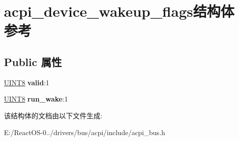 \hypertarget{structacpi__device__wakeup__flags}{}\section{acpi\+\_\+device\+\_\+wakeup\+\_\+flags结构体 参考}
\label{structacpi__device__wakeup__flags}
\subsection*{Public 属性}
\begin{DoxyCompactItemize}
\item 
\mbox{\label{structacpi__device__wakeup__flags_a314608629cdca87c358fc87f6c1158af}} 
\hyperlink{_processor_bind_8h_ab27e9918b538ce9d8ca692479b375b6a}{U\+I\+N\+T8} {\bfseries valid}\+:1
\item 
\mbox{\label{structacpi__device__wakeup__flags_ac9c0e88bbbe1d8ca8962ff822b3b0f3c}} 
\hyperlink{_processor_bind_8h_ab27e9918b538ce9d8ca692479b375b6a}{U\+I\+N\+T8} {\bfseries run\+\_\+wake}\+:1
\end{DoxyCompactItemize}


该结构体的文档由以下文件生成\+:\begin{DoxyCompactItemize}
\item 
E\+:/\+React\+O\+S-\/0../drivers/bus/acpi/include/acpi\+\_\+bus.\+h\end{DoxyCompactItemize}
